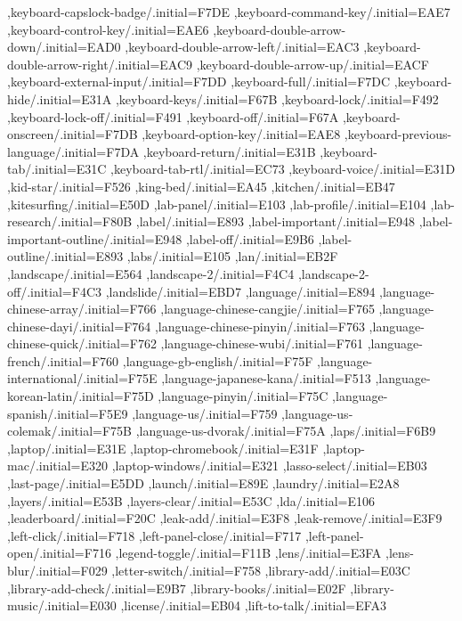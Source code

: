 { ,keyboard-capslock-badge/.initial=F7DE
 ,keyboard-command-key/.initial=EAE7
 ,keyboard-control-key/.initial=EAE6
 ,keyboard-double-arrow-down/.initial=EAD0
 ,keyboard-double-arrow-left/.initial=EAC3
 ,keyboard-double-arrow-right/.initial=EAC9
 ,keyboard-double-arrow-up/.initial=EACF
 ,keyboard-external-input/.initial=F7DD
 ,keyboard-full/.initial=F7DC
 ,keyboard-hide/.initial=E31A
 ,keyboard-keys/.initial=F67B
 ,keyboard-lock/.initial=F492
 ,keyboard-lock-off/.initial=F491
 ,keyboard-off/.initial=F67A
 ,keyboard-onscreen/.initial=F7DB
 ,keyboard-option-key/.initial=EAE8
 ,keyboard-previous-language/.initial=F7DA
 ,keyboard-return/.initial=E31B
 ,keyboard-tab/.initial=E31C
 ,keyboard-tab-rtl/.initial=EC73
 ,keyboard-voice/.initial=E31D
 ,kid-star/.initial=F526
 ,king-bed/.initial=EA45
 ,kitchen/.initial=EB47
 ,kitesurfing/.initial=E50D
 ,lab-panel/.initial=E103
 ,lab-profile/.initial=E104
 ,lab-research/.initial=F80B
 ,label/.initial=E893
 ,label-important/.initial=E948
 ,label-important-outline/.initial=E948
 ,label-off/.initial=E9B6
 ,label-outline/.initial=E893
 ,labs/.initial=E105
 ,lan/.initial=EB2F
 ,landscape/.initial=E564
 ,landscape-2/.initial=F4C4
 ,landscape-2-off/.initial=F4C3
 ,landslide/.initial=EBD7
 ,language/.initial=E894
 ,language-chinese-array/.initial=F766
 ,language-chinese-cangjie/.initial=F765
 ,language-chinese-dayi/.initial=F764
 ,language-chinese-pinyin/.initial=F763
 ,language-chinese-quick/.initial=F762
 ,language-chinese-wubi/.initial=F761
 ,language-french/.initial=F760
 ,language-gb-english/.initial=F75F
 ,language-international/.initial=F75E
 ,language-japanese-kana/.initial=F513
 ,language-korean-latin/.initial=F75D
 ,language-pinyin/.initial=F75C
 ,language-spanish/.initial=F5E9
 ,language-us/.initial=F759
 ,language-us-colemak/.initial=F75B
 ,language-us-dvorak/.initial=F75A
 ,laps/.initial=F6B9
 ,laptop/.initial=E31E
 ,laptop-chromebook/.initial=E31F
 ,laptop-mac/.initial=E320
 ,laptop-windows/.initial=E321
 ,lasso-select/.initial=EB03
 ,last-page/.initial=E5DD
 ,launch/.initial=E89E
 ,laundry/.initial=E2A8
 ,layers/.initial=E53B
 ,layers-clear/.initial=E53C
 ,lda/.initial=E106
 ,leaderboard/.initial=F20C
 ,leak-add/.initial=E3F8
 ,leak-remove/.initial=E3F9
 ,left-click/.initial=F718
 ,left-panel-close/.initial=F717
 ,left-panel-open/.initial=F716
 ,legend-toggle/.initial=F11B
 ,lens/.initial=E3FA
 ,lens-blur/.initial=F029
 ,letter-switch/.initial=F758
 ,library-add/.initial=E03C
 ,library-add-check/.initial=E9B7
 ,library-books/.initial=E02F
 ,library-music/.initial=E030
 ,license/.initial=EB04
 ,lift-to-talk/.initial=EFA3
}

